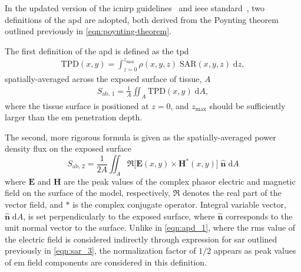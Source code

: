 In the updated version of the \gls{icnirp} guidelines~\cite{ICNIRP2020Guidelines} and \gls{ieee} standard~\cite{IEEE2019Standard}, two definitions of the \gls{apd} are adopted, both derived from the Poynting theorem outlined previously in \cref{eqn:poynting-theorem}.

The first definition of the \gls{apd} is defined as the \gls{tpd}~\cite{Funahashi2018Area-Averaged}
\begin{align}
    \label{eqn:tpd}
    \text{TPD}(x, y) = \int_{z = 0}^{z_\text{max}} \rho(x, y, z) \; \text{SAR}(x, y, z) \; \mathrm{d}z,
\end{align}
spatially-averaged across the exposed surface of tissue, $A$
\begin{align}
    \label{eqn:apd_1}
    S_\text{ab, 1} = \frac{1}{A} \iint_{A} \text{TPD}(x, y) \; \mathrm{d}A,
\end{align}
where the tissue surface is positioned at $z = 0$, and $z_\text{max}$ should be sufficiently larger than the \gls{em} penetration depth.

The second, more rigorous formula is given as the spatially-averaged power density flux on the exposed surface
\begin{equation}
    \label{eqn:apd_2} 
    S_\text{ab, 2} = \frac{1}{2A} \iint_{A} \Re \big[\mathbf{E}(x, y) \times \mathbf{H}^*(x, y) \big] \; \boldsymbol{\hat n} \; \mathrm{d}A
\end{equation}
where $\mathbf{E}$ and $\mathbf{H}$ are the peak values of the complex phasor electric and magnetic field on the surface of the model, respectively, $\Re$ denotes the real part of the vector field, and $*$ is the complex conjugate operator.
Integral variable vector, $\boldsymbol{\hat n} \; \mathrm{d}A$, is set perpendicularly to the exposed surface, where  $\boldsymbol{\hat n}$ corresponds to the unit normal vector to the surface.
Unlike in \cref{eqn:apd_1}, where the \gls{rms} value of the electric field is considered indirectly through expression for \gls{sar} outlined previously in \cref{eqn:sar_3}, the normalization factor of $1/2$ appears as peak values of \gls{em} field components are considered in this definition.

